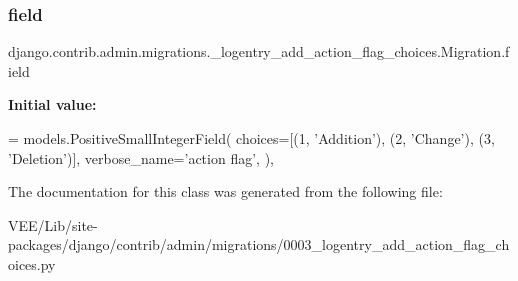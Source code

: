 \subsubsection{\texorpdfstring{field}{field}}
{\footnotesize\ttfamily django.\+contrib.\+admin.\+migrations.\+\_\+logentry\+\_\+add\+\_\+action\+\_\+flag\+\_\+choices.\+Migration.\+field\hspace{0.3cm}{\ttfamily [static]}}

{\bfseries Initial value\+:}
\begin{DoxyCode}
= models.PositiveSmallIntegerField(
                choices=[(1, \textcolor{stringliteral}{'Addition'}), (2, \textcolor{stringliteral}{'Change'}), (3, \textcolor{stringliteral}{'Deletion'})],
                verbose\_name=\textcolor{stringliteral}{'action flag'},
            ),
\end{DoxyCode}


The documentation for this class was generated from the following file\+:\begin{DoxyCompactItemize}
\item 
V\+E\+E/\+Lib/site-\/packages/django/contrib/admin/migrations/0003\+\_\+logentry\+\_\+add\+\_\+action\+\_\+flag\+\_\+choices.\+py\end{DoxyCompactItemize}
